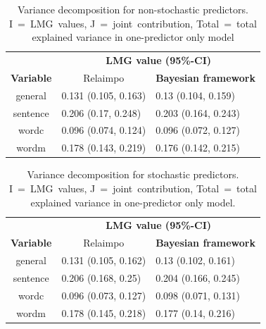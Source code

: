 \documentclass[11pt,a4paper,twoside]{book}
\begin{document}
\begin{table}[h]
\caption{Variance decomposition for non-stochastic predictors. I~=~LMG~values, J~=~joint~contribution, Total~=~total explained variance in one-predictor only model}
\centering
\begin{tabular}{cll}
   \toprule
   &\multicolumn{2}{c}{\textbf{LMG value (95\%-CI)}} \\
 \textbf{Variable} & \multicolumn{1}{c}{Relaimpo} & \textbf{Bayesian framework}  \\
  \hline
general & 0.131 (0.105, 0.163)  & 0.13 (0.104, 0.159)  \\ 
sentence & 0.206 (0.17, 0.248)  & 0.203 (0.164, 0.243)   \\ 
wordc & 0.096 (0.074, 0.124)  & 0.096 (0.072, 0.127)  \\ 
wordm & 0.178 (0.143, 0.219) & 0.176 (0.142, 0.215)  \\ 
   \bottomrule
\end{tabular}
\label{tbl:empirical.relaimp.comp}
\end{table}





\begin{table}[h]
\caption{Variance decomposition for stochastic predictors. I~=~LMG~values, J~=~joint~contribution, Total~=~total explained variance in one-predictor only model.}
\centering
\begin{tabular}{cll}
   \toprule
   &\multicolumn{2}{c}{\textbf{LMG value (95\%-CI)}} \\
 \textbf{Variable} & \multicolumn{1}{c}{Relaimpo} & \textbf{Bayesian framework}  \\
  \hline
general & 0.131 (0.105, 0.162)  &  0.13 (0.102, 0.161)  \\ 
sentence & 0.206 (0.168, 0.25)  &  0.204 (0.166, 0.245)   \\ 
wordc & 0.096 (0.073, 0.127)  &  0.098 (0.071, 0.131)  \\ 
wordm & 0.178 (0.145, 0.218) &  0.177 (0.14, 0.216) \\ 
   \bottomrule
\end{tabular}
\label{tbl:empirical.relaimp.comp.stoch}
\end{table}




 

\end{document}
